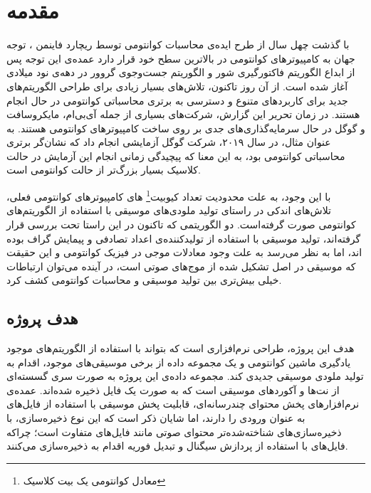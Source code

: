 
\chapter{مقدمه}


با گذشت چهل سال از طرح ایده‌ی محاسبات کوانتومی توسط ریچارد فاینمن
\cite{feynman}،
توجه جهان به کامپیوترهای کوانتومی در بالاترین سطح خود قرار دارد
عمده‌ی این توجه پس از ابداع الگوریتم فاکتورگیری شور
و الگوریتم جست‌وجوی گروور 
در دهه‌ی نود میلادی آغاز شده است. از آن روز تاکنون، تلاش‌های بسیار زیادی برای طراحی الگوریتم‌های جدید برای کاربردهای متنوع و دسترسی به برتری محاسباتی کوانتومی در حال انجام هستند. در زمان تحریر این گزارش، شرکت‌های بسیاری از جمله آی‌بی‌ام، مایکروسافت و گوگل در حال سرمایه‌گذاری‌های جدی بر روی ساخت کامپیوترهای کوانتومی هستند. به عنوان مثال، در سال ۲۰۱۹،
شرکت گوگل آزمایشی 
\cite{google_supremacy}
انجام داد که نشان‌گر برتری محاسباتی کوانتومی بود، به این معنا که پیچیدگی زمانی انجام این آزمایش در حالت کلاسیک بسیار بزرگ‌تر از حالت کوانتومی است.

با این وجود، به علت محدودیت تعداد کیوبیت\footnote{معادل کوانتومی یک بیت کلاسیک}
های کامپیوترهای کوانتومی فعلی، تلاش‌های اندکی در راستای تولید ملودی‌های موسیقی با استفاده از الگوریتم‌های کوانتومی صورت گرفته‌است. دو الگوریتمی که تاکنون در این راستا تحت بررسی قرار گرفته‌اند، تولید موسیقی با استفاده از تولیدکننده‌ی اعداد تصادفی
و پیمایش گراف 
\cite{miranda}
بوده اند، اما به نظر می‌رسد به علت وجود معادلات موجی در فیزیک کوانتومی و این حقیقت که موسیقی در اصل تشکیل شده از موج‌های صوتی است، در آینده می‌توان ارتباطات خیلی بیش‌تری بین تولید موسیقی و محاسبات کوانتومی کشف کرد.

\newpage
\section{هدف پروژه}
هدف این پروژه، طراحی نرم‌افزاری است که بتواند با استفاده از الگوریتم‌های موجود یادگیری ماشین کوانتومی و یک  مجموعه داده از برخی موسیقی‌های موجود، اقدام به تولید ملودی موسیقی جدیدی کند.
مجموعه داده‌ی این پروژه به صورت سری گسسته‌ای از نت‌ها و آکوردهای موسیقی است که به صورت یک فایل 
ذخیره شده‌اند.
عمده‌ی نرم‌افزارهای پخش محتوای چندرسانه‌ای، قابلیت پخش موسیقی با استفاده از فایل‌های 
به عنوان ورودی را دارند، اما
 شایان ذکر است که این نوع ذخیره‌سازی، با ذخیره‌سازی‌های شناخته‌شده‌تر محتوای صوتی مانند فایل‌های 
 متفاوت است؛ چراکه فایل‌های
 با استفاده از پردازش سیگنال و تبدیل فوریه اقدام به ذخیره‌سازی می‌کنند.
 

